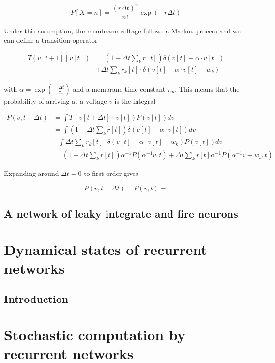 \documentclass{ucetd}
\begin{document}
\begin{equation*}
P[X=n] = \frac{(r\Delta t)^{n}}{n!}\exp\left(-r\Delta t\right)
\end{equation*}

Under this assumption, the membrane voltage follows a Markov process and we can define a transition operator

\begin{align*}
T(v[t+1]\;|\;v[t]) &= \left(1-\Delta t\sum_{k}r[t]\right)\delta\left(v[t]-\alpha\cdot v[t]\right)\\
&+ \Delta t\sum_{k}r_{k}[t]\cdot\delta\left(v[t]-\alpha \cdot v[t] + w_{k}\right)
\end{align*}

with $\alpha = \exp\left(-\frac{\Delta t}{\tau_{m}}\right)$ and a membrane time constant $\tau_{m}$. This means that the probability of arriving at a voltage $v$ is the integral

\begin{align*}
P(v,t+\Delta t) &= \int T(v[t+\Delta t]\;|\;v[t])P(v[t])dv\\
&= \int \left(1-\Delta t\sum_{k}r[t]\right)\delta\left(v[t]-\alpha\cdot v[t]\right)dv\\
&+ \int \Delta t\sum_{k}r_{k}[t]\cdot\delta\left(v[t]-\alpha \cdot v[t] + w_{k}\right)P(v[t])dv\\
&= \left(1-\Delta t\sum_{k}r[t]\right)\alpha^{-1}P(\alpha^{-1}v,t) + \Delta t \sum_{k}r[t] \alpha^{-1}P(\alpha^{-1}v-w_{k},t)
\end{align*}

Expanding around $\Delta t = 0$ to first order gives

\begin{equation*}
P(v,t+\Delta t) - P(v,t) = 
\end{equation*}

\section{A network of leaky integrate and fire neurons}


\chapter{Dynamical states of recurrent networks}
\section{Introduction}


\chapter{Stochastic computation by recurrent networks}
\end{document}
